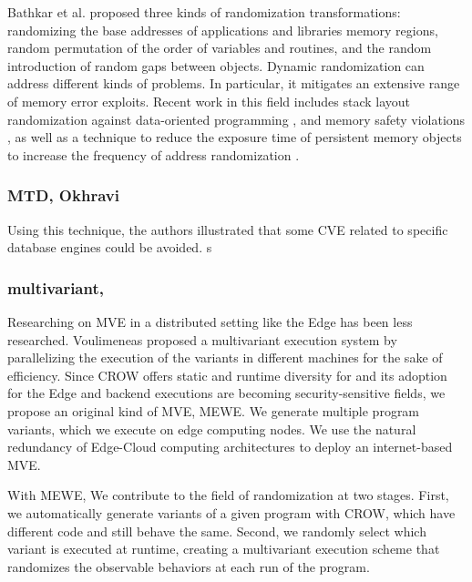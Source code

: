 Bathkar et al. \cite{bhatkar03,bhatkar2005efficient} proposed three kinds of randomization transformations: randomizing the base addresses of applications and libraries  memory regions, random permutation of the order of variables and routines, and the random introduction of random gaps between objects. 
Dynamic randomization can address different kinds of problems. In particular, it mitigates an extensive range of memory error exploits. 
Recent work in this field includes stack layout randomization against data-oriented programming \cite{aga2019smokestack}, and memory safety violations \cite{lee2021savior}, as well as a technique to reduce the exposure time of persistent memory objects to increase the frequency of address randomization \cite{xu2020merr}.



\subsubsection{MTD, Okhravi}





Using this technique, the authors illustrated that some CVE related to specific database engines could be avoided.
s

\subsubsection{multivariant, }








Researching on MVE in a distributed setting like the Edge \citationneeded has been less researched. Voulimeneas \etal proposed a multivariant execution system by parallelizing the execution of the variants in different machines \cite{voulimeneas2021dmvx} for the sake of efficiency. Since CROW offers static and runtime diversity for \wasm and its adoption for the Edge and backend executions are becoming security-sensitive fields, we propose an original kind of MVE, MEWE. We generate multiple program variants, which we execute on edge computing nodes. We use the natural redundancy of Edge-Cloud computing architectures to deploy an internet-based MVE.

With MEWE, We contribute to the field of randomization at two stages. First, we automatically generate variants of a given program with CROW, which have different \wasm code and still behave the same. Second, we randomly select which variant is executed at runtime, creating a multivariant execution scheme that randomizes the observable behaviors at each run of the program.


